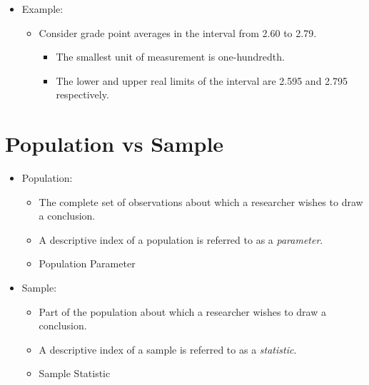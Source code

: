 \documentclass[12pt]{article}
\begin{document}
\begin{itemize}
\itemsep1pt\parskip0pt
\item
  Example:

  \begin{itemize}
  \itemsep1pt\parskip0pt
  \item
    Consider grade point averages in the interval from 2.60 to 2.79.

    \begin{itemize}
    \itemsep1pt\parskip0pt
    \item
      The smallest unit of measurement is one-hundredth.
    \item
      The lower and upper real limits of the interval are 2.595 and
      2.795 respectively.
    \end{itemize}
  \end{itemize}
\end{itemize}

\section{Population vs Sample}\label{population-vs-sample}

\begin{itemize}
\itemsep1pt\parskip0pt
\item
  Population:

  \begin{itemize}
  \itemsep1pt\parskip0pt
  \item
    The complete set of observations about which a researcher wishes to
    draw a conclusion.
  \item
    A descriptive index of a population is referred to as a
    \emph{parameter}.
  \item
    Population Parameter
  \end{itemize}
\item
  Sample:

  \begin{itemize}
  \itemsep1pt\parskip0pt
  \item
    Part of the population about which a researcher wishes to draw a
    conclusion.
  \item
    A descriptive index of a sample is referred to as a
    \emph{statistic}.
  \item
    Sample Statistic
  \end{itemize}
\end{itemize}
\end{document}
